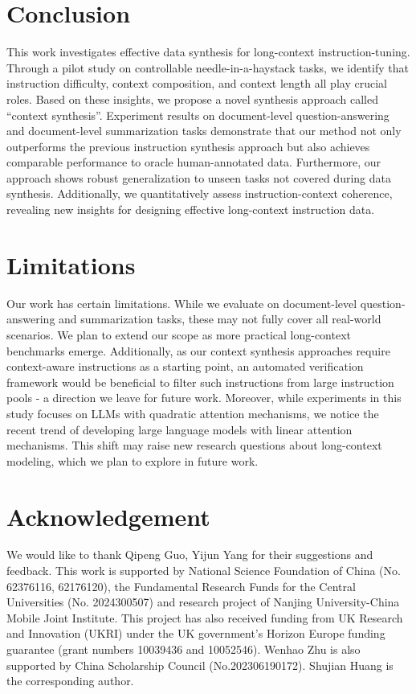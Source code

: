 \section{Conclusion}
This work investigates effective data synthesis for long-context instruction-tuning.
Through a pilot study on controllable needle-in-a-haystack tasks, we identify that instruction difficulty, context composition, and context length all play crucial roles.
Based on these insights, we propose a novel synthesis approach called ``context synthesis''.
Experiment results on document-level question-answering and document-level summarization tasks demonstrate that our method not only outperforms the previous instruction synthesis approach but also achieves comparable performance to oracle human-annotated data.
Furthermore, our approach shows robust generalization to unseen tasks not covered during data synthesis. 
Additionally, we quantitatively assess instruction-context coherence, revealing new insights for designing effective long-context instruction data.

\section*{Limitations}
Our work has certain limitations.
While we evaluate on document-level question-answering and summarization tasks, these may not fully cover all real-world scenarios.
We plan to extend our scope as more practical long-context benchmarks emerge.
Additionally, as our context synthesis approaches require context-aware instructions as a starting point, an automated verification framework would be beneficial to filter such instructions from large instruction pools - a direction we leave for future work.
Moreover, while experiments in this study focuses on LLMs with quadratic attention mechanisms, we notice the recent trend of developing large language models with linear attention mechanisms. 
This shift may raise new research questions about long-context modeling, which we plan to explore in future work.

\section*{Acknowledgement}
We would like to thank Qipeng Guo, Yijun Yang for their suggestions and feedback.
This work is supported by National Science Foundation of China (No. 62376116, 62176120), the Fundamental Research Funds for the Central Universities (No. 2024300507) and research project of Nanjing University-China Mobile Joint Institute.
This project has also received funding from UK Research and Innovation (UKRI) under the UK government's Horizon Europe funding guarantee (grant numbers 10039436 and 10052546).
Wenhao Zhu is also supported by China Scholarship Council (No.202306190172).
Shujian Huang is the corresponding author. 